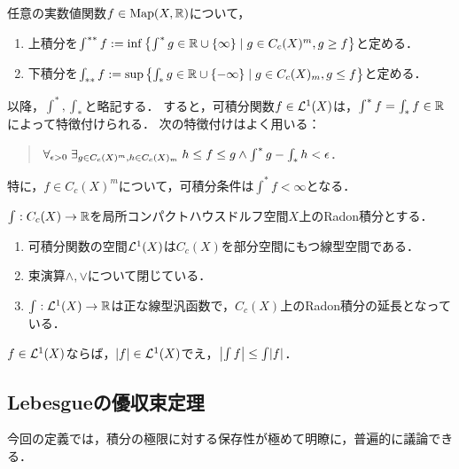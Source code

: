 \documentclass[uplatex,dvipdfmx]{jsreport}
\begin{document}
\begin{definition}
    任意の実数値関数$f\in\mathrm{Map}(X,\mathbb{R})$について，
    \begin{enumerate}
        \item 上積分を$\int^{**}f:=\inf\left\{\int^*g\in\mathbb{R}\cup\{\infty\}\mid g\in C_c(X)^m,g\ge f\right\}$と定める．
        \item 下積分を$\int_{**}f:=\sup\left\{\int_*g\in\mathbb{R}\cup\{-\infty\}\mid g\in C_c(X)_m,g\le f\right\}$と定める．
    \end{enumerate}
    以降，$\int^*,\int_*$と略記する．
    すると，可積分関数$f\in\mathcal{L}^1(X)$は，$\int^{*}f=\int_{*}f\in\mathbb{R}$によって特徴付けられる．
    次の特徴付けはよく用いる：
    \begin{quote}
        $\forall_{\epsilon>0}\;\exists_{g\in C_c(X)^m,h\in C_c(X)_m}\;h\le f\le g\land\int^*g-\int_*h<\epsilon$．
    \end{quote}
    特に，$f\in C_c(X)^m$について，可積分条件は$\int^*f<\infty$となる．
\end{definition}

\begin{theorem}\label{thm-extension-of-Radon-integral}
    $\int:C_c(X)\to\mathbb{R}$を局所コンパクトハウスドルフ空間$X$上のRadon積分とする．
    \begin{enumerate}
        \item 可積分関数の空間$\mathcal{L}^1(X)$は$C_c(X)$を部分空間にもつ線型空間である．
        \item 束演算$\land,\lor$について閉じている．
        \item $\int:\mathcal{L}^1(X)\to\mathbb{R}$は正な線型汎函数で，$C_c(X)$上のRadon積分の延長となっている．
    \end{enumerate}
\end{theorem}

\begin{corollary}[三角不等式]
    $f\in\mathcal{L}^1(X)$ならば，$\lvert f\rvert\in\mathcal{L}^1(X)$でえ，$\left|\int f\right|\le\int\lvert f\rvert$．
\end{corollary}

\subsection{Lebesgueの優収束定理}

\begin{tcolorbox}[colframe=ForestGreen, colback=ForestGreen!10!white,breakable,colbacktitle=ForestGreen!40!white,coltitle=black,fonttitle=\bfseries\sffamily,
title=]
    今回の定義では，積分の極限に対する保存性が極めて明瞭に，普遍的に議論できる．
\end{tcolorbox}
\end{document}
